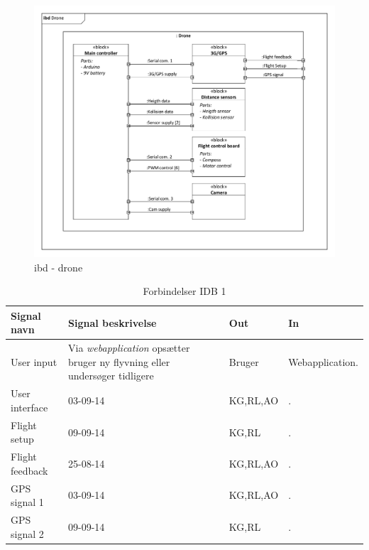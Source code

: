 

\begin{figure}[H]
\centering
\includegraphics[width=1\textwidth]{Billeder/IBD/ibd2_drone.pdf}
\caption{ibd - drone}
\label{fig:ibd_drone}
\end{figure}

\begin{table}[H]
	\centering
		\begin{tabular}{|p{2.5 cm}|p{5.5 cm}|p{2.5 cm}|p{2.5 cm}|} 
		\hline
			\textbf{Signal navn} 	& \textbf{Signal beskrivelse}		& \textbf{Out} 				& \textbf{In}     \\ \hline
			User input 			& Via \textit{webapplication} opsætter bruger ny flyvning eller undersøger tidligere & Bruger 		& Webapplication.			    \\ \hline
			User interface 		& 03-09-14	& KG,RL,AO				& .				\\ \hline
			Flight setup		& 09-09-14	& KG,RL					& .	\\ \hline
			Flight feedback		& 25-08-14	& KG,RL,AO				& .			    \\ \hline
			GPS signal 1		& 03-09-14	& KG,RL,AO				& .				\\ \hline
			GPS signal 2		& 09-09-14	& KG,RL					& .	\\ \hline  
		\end{tabular}
	\caption{Forbindelser IDB 1}
	\label{tab:IDB1}
\end{table}

